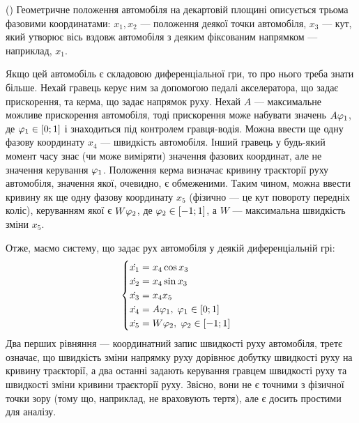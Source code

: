 \begin{example}(\cite{1})
    Геометричне положення автомобіля на декартовій площині описується трьома фазовими координатами:
    $x_1, x_2$ --- положення деякої точки автомобіля, $x_3$ --- кут, який утворює вісь вздовж автомобіля
    з деяким фіксованим напрямком --- наприклад, $x_1$.
    \begin{center}
    \end{center}
    Якщо цей автомобіль є складовою диференціальної гри, то про нього треба знати більше. Нехай гравець керує ним за допомогою педалі акселератора, що
    задає прискорення, та керма, що задає напрямок руху. Нехай $A$ --- максимальне можливе прискорення автомобіля, тоді прискорення може набувати значень
    $A \varphi_1$, де $\varphi_1 \in [0; 1]$ і знаходиться під контролем гравця-водія. Можна ввести ще одну фазову координату $x_4$ --- швидкість автомобіля.
    Інший гравець у будь-який момент часу знає (чи може виміряти) значення фазових координат, але не значення керування $\varphi_1$. Положення керма визначає кривину траєкторії
    руху автомобіля, значення якої, очевидно, є обмеженими. Таким чином, можна ввести кривину як ще одну фазову координату $x_5$
    (фізично --- це кут повороту передніх коліс), керуванням якої є $W \varphi_2$, де $\varphi_2 \in [-1; 1]$, а $W$ --- максимальна швидкість зміни $x_5$.
    
    Отже, маємо систему, що задає рух автомобіля у деякій диференціальній грі:
    \begin{gather*}
        \begin{cases}
            \dot{x_1} = x_4 \cos{x_3} \\
            \dot{x_2} = x_4 \sin{x_3} \\
            \dot{x_3} = x_4 x_5 \\
            \dot{x_4} = A \varphi_1, \; \varphi_1 \in [0; 1] \\
            \dot{x_5} = W \varphi_2, \; \varphi_2 \in [-1; 1]
        \end{cases}
    \end{gather*}
    Два перших рівняння --- координатний запис швидкості руху автомобіля, третє означає, що швидкість зміни напрямку руху дорівнює добутку швидкості руху на кривину траєкторії,
    а два останні задають керування гравцем швидкості руху та швидкості зміни кривини траєкторії руху. Звісно, вони не є точними з фізичної точки зору (тому що, наприклад, не враховують тертя), але
    є досить простими для аналізу.
\end{example}
